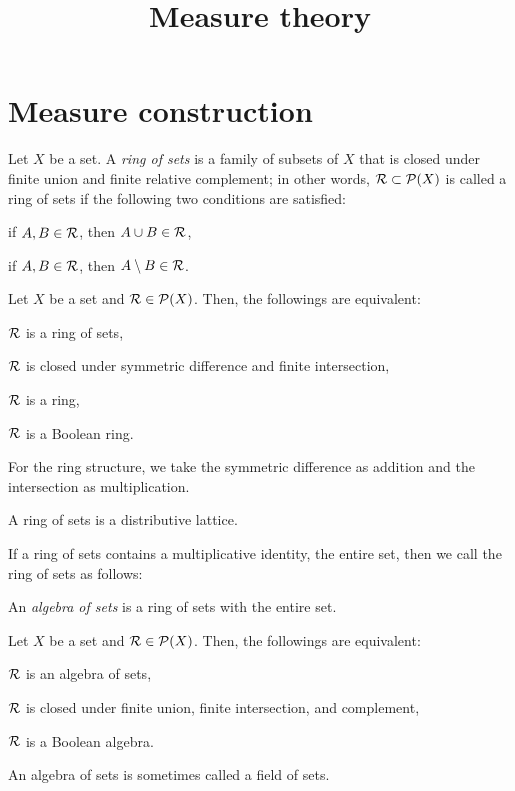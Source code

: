 \documentclass{../exp}
\title{Measure theory}
\begin{document}
\maketitle


\section{Measure construction}
\begin{defn}
Let $X$ be a set.
A \emph{ring of sets} is a family of subsets of $X$ that is closed under finite union and finite relative complement; in other words, $\mathcal{R}\subset\mathcal{P}(X)$ is called a ring of sets if the following two conditions are satisfied:
\begin{cond}
\item if $A,B\in\mathcal{R}$, then $A\cup B\in\mathcal{R}$,
\item if $A,B\in\mathcal{R}$, then $A\setminus B\in\mathcal{R}$.
\end{cond}
\end{defn}

\begin{prop}
Let $X$ be a set and $\mathcal{R}\in\mathcal{P}(X)$.
Then, the followings are equivalent:
\begin{cond}
\item $\mathcal{R}$ is a ring of sets,
\item $\mathcal{R}$ is closed under symmetric difference and finite intersection,
\item $\mathcal{R}$ is a ring,
\item $\mathcal{R}$ is a Boolean ring.
\end{cond}
For the ring structure, we take the symmetric difference as addition and the intersection as multiplication.
\end{prop}

\begin{prop}
A ring of sets is a distributive lattice.
\end{prop}


If a ring of sets contains a multiplicative identity, the entire set, then we call the ring of sets as follows:
\begin{defn}
An \emph{algebra of sets} is a ring of sets with the entire set.
\end{defn}
\begin{prop}
Let $X$ be a set and $\mathcal{R}\in\mathcal{P}(X)$.
Then, the followings are equivalent:
\begin{cond}
\item $\mathcal{R}$ is an algebra of sets,
\item $\mathcal{R}$ is closed under finite union, finite intersection, and complement,
\item $\mathcal{R}$ is a Boolean algebra.
\end{cond}
\end{prop}
An algebra of sets is sometimes called a field of sets.
\end{document}
